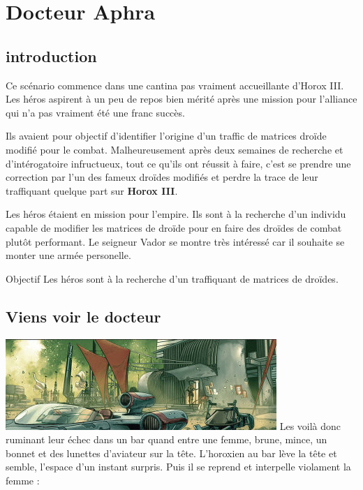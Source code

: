 \section{Docteur Aphra}

\subsection{introduction}
Ce scénario commence dans une cantina pas vraiment accueillante d’Horox III. Les héros aspirent à un peu de repos bien mérité après une mission pour l’alliance qui n’a pas vraiment été une franc succès.

\lettrine{\jedifont{\$}} Ils avaient pour objectif d’identifier l’origine d’un traffic de matrices droïde modifié pour le combat. Malheureusement après deux semaines de recherche et d’intérogatoire infructueux, tout ce qu’ils ont réussit à faire, c’est se prendre une correction par l’un des fameux droïdes modifiés et perdre la trace de leur traffiquant quelque part sur \textbf{Horox III}. 

\lettrine{\jedifont{\#}} Les héros étaient en mission pour l’empire. Ils sont à la recherche d’un individu capable de modifier les matrices de droïde pour en faire des droïdes de combat plutôt performant. Le seigneur Vador se montre très intéressé car il souhaite se monter une armée personelle.

\begin{paperbox}{Objectif}
Les héros sont à la recherche d’un traffiquant de matrices de droïdes.
\end{paperbox}

\subsection{Viens voir le docteur}
\noindent\includegraphics[width=\linewidth]{_img/places/cantina-horox-iii.jpg}
Les voilà donc ruminant leur échec dans un bar quand entre une femme, brune, mince, un bonnet et des lunettes d’aviateur sur la tête. L’horoxien au bar lève la tête et semble, l’espace d’un instant surpris. Puis il se reprend et interpelle violament la femme :

